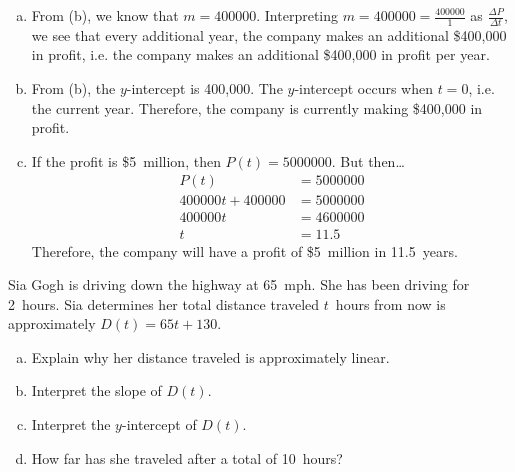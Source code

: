 \documentclass[12pt,letterpaper]{exam}
\begin{document}
\begin{questions}
{\begin{enumerate}[(a)]
\item From (b), we know that $m= 400000$. Interpreting $m= 400000= \frac{400000}{1}$ as $\frac{\Delta P}{\Delta t}$, we see that every additional year, the company makes an additional \$400,000 in profit, i.e. the company makes an additional \$400,000 in profit per year. \pspace

\item From (b), the $y$-intercept is 400,000. The $y$-intercept occurs when $t= 0$, i.e. the current year. Therefore, the company is currently making \$400,000 in profit. \pspace

\item If the profit is \$5~million, then $P(t)= 5000000$. But then\dots
	\[
	\begin{aligned}
	P(t)&= 5000000 \\
	400000t + 400000&= 5000000 \\
	400000t&= 4600000 \\
	t&= 11.5
	\end{aligned}
	\]
Therefore, the company will have a profit of \$5~million in 11.5~years. 
\end{enumerate}
}



\newpage
\question[10] Sia Gogh is driving down the highway at 65~mph. She has been driving for 2~hours. Sia determines her total distance traveled $t$~hours from now is approximately $D(t)= 65t + 130$. 
	\begin{enumerate}[(a)]
	\item Explain why her distance traveled is approximately linear.
	\item Interpret the slope of $D(t)$.
	\item Interpret the $y$-intercept of $D(t)$. 
	\item How far has she traveled after a total of 10~hours?
	\end{enumerate} \pspace

\end{questions}
\end{document}
